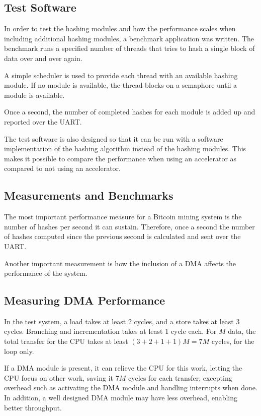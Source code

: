 \subsection{Test Software}
In order to test the hashing modules and how the performance scales when including
additional hashing modules, a benchmark application was written. The benchmark
runs a specified number of threads that tries to hash a single block of data
over and over again.

A simple scheduler is used to provide each thread with an available hashing module.
If no module is available, the thread blocks on a semaphore until a module is available.

Once a second, the number of completed hashes for each module is added up and
reported over the UART.

The test software is also designed so that it can be run with a software implementation
of the hashing algorithm instead of the hashing modules. This makes it possible
to compare the performance when using an accelerator as compared to not using
an accelerator.

\subsection{Measurements and Benchmarks}
The most important performance measure for a Bitcoin mining system is the number
of hashes per second it can sustain. Therefore, once a second the number of hashes
computed since the previous second is calculated and sent over the UART.

Another important measurement is how the inclusion of a DMA affects the performance
of the system.

\subsection{Measuring DMA Performance}

In the test system, a load takes at least 2 cycles, and a store takes at least 3 cycles.
Branching and incrementation takes at least 1 cycle each.
For $M$ data, the total transfer for the CPU takes at least $(3 + 2 + 1 + 1)M = 7M$ cycles, for the loop only.

If a DMA module is present, it can relieve the CPU for this work, letting the CPU focus on other work, saving it $7M$ cycles for each transfer, excepting overhead such as activating the DMA module and handling interrupts when done.
In addition, a well designed DMA module may have less overhead, enabling better  throughput.

